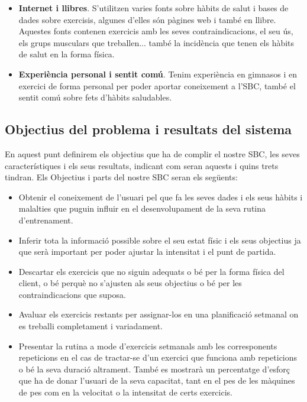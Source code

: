 \begin{itemize}
    \item \textbf{Internet i llibres}. S'utilitzen varies fonts sobre hàbits de salut\cite{health}\cite{fitnesspal} i bases de dades sobre exercisis, algunes d'elles són pàgines web\cite{bodybuild}\cite{fitnesspal} i també en llibre\cite{strech}.
    Aquestes fonts contenen exercicis amb les seves contraindicacions, el seu ús, els grups musculars que treballen... també la incidència que tenen els hàbits de salut en la forma física.
    
    \item \textbf{Experiència personal i sentit comú}. Tenim experiència en gimnasos i en exercici de forma personal per poder aportar coneixement a l'SBC, també el sentit comú sobre fets d'hàbits saludables.
    
\end{itemize}

\subsection{Objectius del problema i resultats del sistema}
En aquest punt definirem els objectius que ha de complir el nostre SBC, les seves característiques i els seus resultats, indicant com seran aquests i quins trets tindran. Els Objectius i parts del nostre SBC seran els següents:

\begin{itemize}
    
    \item Obtenir el coneixement de l'usuari pel que fa les seves dades i els seus hàbits i malalties que puguin influir en el desenvolupament de la seva rutina d'entrenament.
    
    \item Inferir tota la informació possible sobre el seu estat físic i els seus objectius ja que serà important per poder ajustar la intensitat i el punt de partida.
    
    \item Descartar els exercicis que no siguin adequats o bé per la forma física del client, o bé perquè no s'ajusten als seus objectius o bé per les contraindicacions que suposa.
    
    \item Avaluar els exercicis restants per assignar-los en una planificació setmanal on es treballi completament i variadament.
    
    \item Presentar la rutina a mode d'exercicis setmanals amb les corresponents repeticions en el cas de tractar-se d'un exercici que funciona amb repeticions o bé la seva duració altrament. També es mostrarà un percentatge d'esforç que ha de donar l'usuari de la seva capacitat, tant en el pes de les màquines de pes com en la velocitat o la intensitat de certs exercicis.
    
    
\end{itemize}


